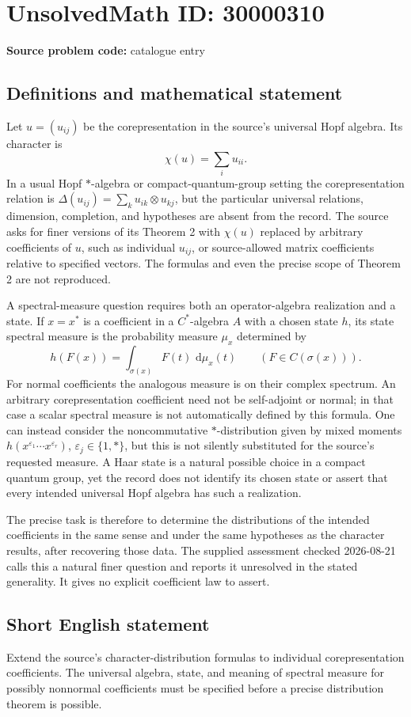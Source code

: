 \documentclass[11pt]{article}
\newcommand{\dd}{\,\mathrm{d}}
\begin{document}
\section*{UnsolvedMath ID: 30000310}
\textbf{Source problem code:} catalogue entry
\subsection{Definitions and mathematical statement}
Let \(u=(u_{ij})\) be the corepresentation in the source's universal Hopf algebra. Its character is
\[
\chi(u)=\sum_i u_{ii}.
\]
In a usual Hopf \(*\)-algebra or compact-quantum-group setting the corepresentation relation is \(\Delta(u_{ij})=\sum_k u_{ik}\otimes u_{kj}\), but the particular universal relations, dimension, completion, and hypotheses are absent from the record. The source asks for finer versions of its Theorem 2 with \(\chi(u)\) replaced by arbitrary coefficients of \(u\), such as individual \(u_{ij}\), or source-allowed matrix coefficients relative to specified vectors. The formulas and even the precise scope of Theorem 2 are not reproduced.

A spectral-measure question requires both an operator-algebra realization and a state. If \(x=x^*\) is a coefficient in a \(C^*\)-algebra \(A\) with a chosen state \(h\), its state spectral measure is the probability measure \(\mu_x\) determined by
\[
h(F(x))=\int_{\sigma(x)}F(t)\,\dd\mu_x(t)
\qquad(F\in C(\sigma(x))).
\]
For normal coefficients the analogous measure is on their complex spectrum. An arbitrary corepresentation coefficient need not be self-adjoint or normal; in that case a scalar spectral measure is not automatically defined by this formula. One can instead consider the noncommutative \(*\)-distribution given by mixed moments \(h(x^{\varepsilon_1}\cdots x^{\varepsilon_r})\), \(\varepsilon_j\in\{1,*\}\), but this is not silently substituted for the source's requested measure. A Haar state is a natural possible choice in a compact quantum group, yet the record does not identify its chosen state or assert that every intended universal Hopf algebra has such a realization.

The precise task is therefore to determine the distributions of the intended coefficients in the same sense and under the same hypotheses as the character results, after recovering those data. The supplied assessment checked 2026-08-21 calls this a natural finer question and reports it unresolved in the stated generality. It gives no explicit coefficient law to assert.
\subsection{Short English statement}
Extend the source's character-distribution formulas to individual corepresentation coefficients. The universal algebra, state, and meaning of spectral measure for possibly nonnormal coefficients must be specified before a precise distribution theorem is possible.
\end{document}
